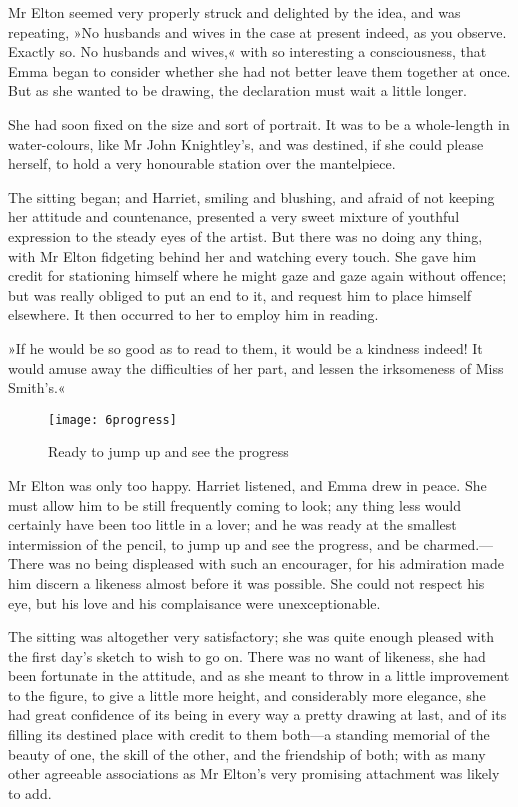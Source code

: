 Mr Elton seemed very properly struck and delighted by the idea, and was repeating, »No husbands and wives in the case at present indeed, as you observe. Exactly so. No husbands and wives,« with so interesting a consciousness, that Emma began to consider whether she had not better leave them together at once. But as she wanted to be drawing, the declaration must wait a little longer.

She had soon fixed on the size and sort of portrait. It was to be a whole-length in water-colours, like Mr John Knightley's, and was destined, if she could please herself, to hold a very honourable station over the mantelpiece.

The sitting began; and Harriet, smiling and blushing, and afraid of not keeping her attitude and countenance, presented a very sweet mixture of youthful expression to the steady eyes of the artist. But there was no doing any thing, with Mr Elton fidgeting behind her and watching every touch. She gave him credit for stationing himself where he might gaze and gaze again without offence; but was really obliged to put an end to it, and request him to place himself elsewhere. It then occurred to her to employ him in reading.

»If he would be so good as to read to them, it would be a kindness indeed! It would amuse away the difficulties of her part, and lessen the irksomeness of Miss Smith's.«


\begin{figure}[tbph]
\centering
\texttt{[image: 6progress]}
\caption{Ready to jump up and see the progress}
\end{figure}

Mr Elton was only too happy. Harriet listened, and Emma drew in peace. She must allow him to be still frequently coming to look; any thing less would certainly have been too little in a lover; and he was ready at the smallest intermission of the pencil, to jump up and see the progress, and be charmed.—There was no being displeased with such an encourager, for his admiration made him discern a likeness almost before it was possible. She could not respect his eye, but his love and his complaisance were unexceptionable.

The sitting was altogether very satisfactory; she was quite enough pleased with the first day's sketch to wish to go on. There was no want of likeness, she had been fortunate in the attitude, and as she meant to throw in a little improvement to the figure, to give a little more height, and considerably more elegance, she had great confidence of its being in every way a pretty drawing at last, and of its filling its destined place with credit to them both—a standing memorial of the beauty of one, the skill of the other, and the friendship of both; with as many other agreeable associations as Mr Elton's very promising attachment was likely to add.

